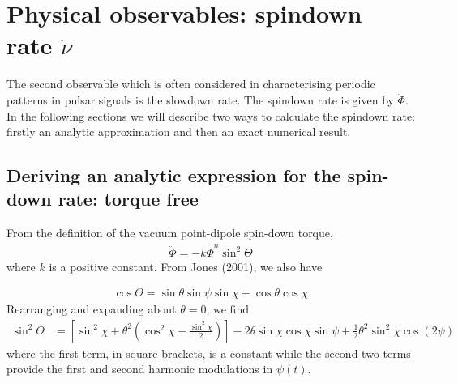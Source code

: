 \documentclass[../full_thesis/full_thesis.tex]{subfiles}
\begin{document}
\section{Physical observables: spindown rate $\dot{\nu}$}

The second observable which is often considered in characterising periodic
patterns in pulsar signals is the slowdown rate. The spindown rate is given by
$\ddot{\Phi}$. In the following sections we will describe two ways to calculate
the spindown rate: firstly an analytic approximation and then an exact numerical
result.

\subsection{Deriving an analytic expression for the spin-down rate: torque free}
From the definition of the vacuum point-dipole spin-down torque,
\begin{align}
\ddot{\Phi} = -k \dot{\Phi}^{n} \sin^{2}\Theta
\label{eqn: EM DE}
\end{align}
where $k$ is a positive constant. From Jones (2001), we also have

\begin{align}
\cos\Theta = \sin\theta \sin \psi \sin \chi + \cos\theta \cos\chi
\end{align}
Rearranging and expanding about $\theta = 0$, we find
\begin{align}
\sin^{2}\Theta & =
\left[
\sin^{2}\chi + \theta^{2}\left(\cos^{2}\chi - \frac{\sin^{2}\chi}{2}\right)
\right]
- 2\theta \sin\chi\cos\chi \sin\psi
 + \frac{1}{2}\theta^{2}\sin^{2}\chi\cos(2\psi)
\label{eqn: sin 2 Theta}
\end{align}
where the first term, in square brackets, is a constant while the second two
terms provide the first and second harmonic modulations in $\psi(t)$.
\end{document}
